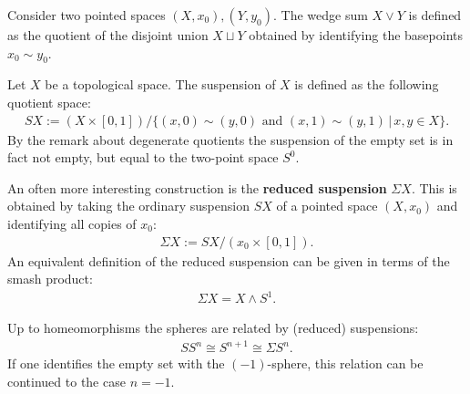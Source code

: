     \begin{construct}
        Consider two pointed spaces $(X,x_0),(Y,y_0)$. The wedge sum $X\vee Y$ is defined as the quotient of the disjoint union $X\sqcup Y$ obtained by identifying the basepoints $x_0\sim y_0$.
    \end{construct}

    \begin{construct}[Suspension]\label{topology:suspension}
        Let $X$ be a topological space. The suspension of $X$ is defined as the following quotient space:
        \begin{gather}
            SX := (X\times [0,1])/\big\{(x,0)\sim (y,0)\text{ and }(x,1)\sim (y,1)\,\big\vert\,x,y\in X\big\}.
        \end{gather}
        By the remark about degenerate quotients the suspension of the empty set is in fact not empty, but equal to the two-point space $S^0$.

        An often more interesting construction is the \textbf{reduced suspension} $\Sigma X$. This is obtained by taking the ordinary suspension $SX$ of a pointed space $(X,x_0)$ and identifying all copies of $x_0$:
        \begin{gather}
            \Sigma X := SX/(x_0\times[0,1]).
        \end{gather}
        An equivalent definition of the reduced suspension can be given in terms of the smash product:
        \begin{gather}
            \Sigma X = X\wedge S^1.
        \end{gather}
    \end{construct}
    \begin{example}[Spheres]\label{topology:sphere_suspension}
        Up to homeomorphisms the spheres are related by (reduced) suspensions:
        \begin{gather}
            SS^n\cong S^{n+1}\cong\Sigma S^n.
        \end{gather}
        If one identifies the empty set with the $(-1)$-sphere, this relation can be continued to the case $n=-1$.
    \end{example}

